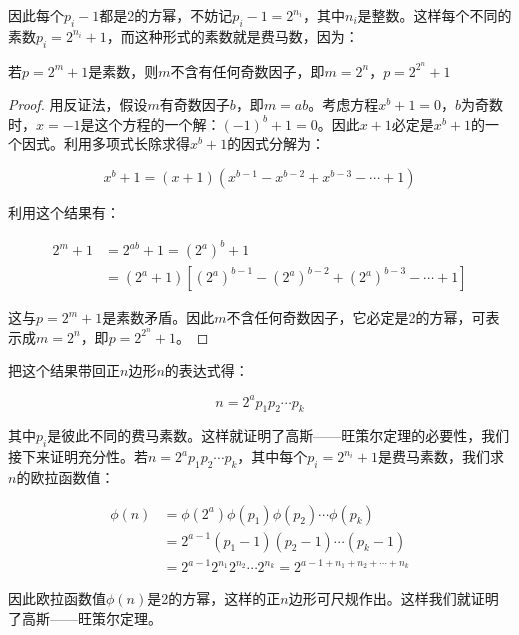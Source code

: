 因此每个$p_i - 1$都是2的方幂，不妨记$p_i - 1 = 2^{n_i}$，其中$n_i$是整数。这样每个不同的素数$p_i = 2^{n_i} + 1$，而这种形式的素数就是费马数，因为：

\begin{proposition}
若$p = 2^m + 1$是素数，则$m$不含有任何奇数因子，即$m = 2^n$，$p = 2^{2^n} + 1$
\end{proposition}

\begin{proof}
用反证法，假设$m$有奇数因子$b$，即$m = ab$。考虑方程$x^b + 1 = 0$，$b$为奇数时，$x = -1$是这个方程的一个解：$(-1)^b + 1 = 0$。因此$x + 1$必定是$x^b + 1$的一个因式。利用多项式长除求得$x^b + 1$的因式分解为：

\[
x^b + 1 = (x + 1)(x^{b-1} - x^{b-2} + x^{b-3} - \dotsb + 1)
\]

利用这个结果有：

\begin{align*}
2^m + 1 &= 2^{ab} + 1 = (2^a)^b + 1 \\
  &= (2^a + 1)[(2^a)^{b-1} - (2^a)^{b-2} + (2^a)^{b-3} - \dotsb + 1]
\end{align*}

这与$p = 2^m + 1$是素数矛盾。因此$m$不含任何奇数因子，它必定是2的方幂，可表示成$m = 2^n$，即$p = 2^{2^n} + 1$。
\end{proof}

把这个结果带回正$n$边形$n$的表达式得：

\[
n = 2^a p_1 p_2 \dotsm p_k
\]

其中$p_i$是彼此不同的费马素数。这样就证明了高斯——旺策尔定理的必要性，我们接下来证明充分性。若$n = 2^a p_1 p_2 \dotsm p_k$，其中每个$p_i = 2^{n_i} + 1$是费马素数，我们求$n$的欧拉函数值：

\begin{align*}
\phi(n) &= \phi(2^a) \phi(p_1) \phi(p_2) \dotsm \phi(p_k)  \\
   &= 2^{a - 1} (p_1 - 1) (p_2 - 1) \dotsm (p_k - 1) \\
   &= 2^{a-1} 2^{n_1} 2^{n_2} \dotsm 2^{n_k} = 2^{a - 1 + n_1 + n_2 + \dotsb + n_k}
\end{align*}

因此欧拉函数值$\phi(n)$是2的方幂，这样的正$n$边形可尺规作出。这样我们就证明了高斯——旺策尔定理。

